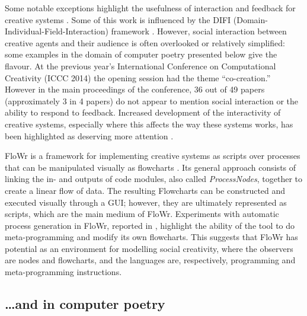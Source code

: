 Some notable exceptions highlight the usefulness of interaction and feedback for creative systems \cite{mcgraw93,
colton00,  sosa09, perezyperez10MM, pease10, saunders12}. Some of this
work is influenced by the DIFI (Domain-Individual-Field-Interaction)
framework \cite{csik88}.  However, social interaction
between creative agents and their audience is often overlooked
or relatively simplified: some examples in the domain of computer poetry presented below give the flavour.
At the previous year's International Conference on Computational Creativity (ICCC 2014) the opening session
had the theme ``co-creation.''  However in the main proceedings of the conference, 36 out of 49 papers
(approximately 3 in 4 papers) do not appear to mention social interaction or the ability to respond to feedback.
Increased development of the interactivity of creative systems, especially where this affects the way these systems works, has been highlighted as deserving more attention \cite{coltonwiggins12}.

FloWr is a framework for implementing creative systems as scripts over processes that can be manipulated visually as flowcharts \cite{charnley2014flowr}.  Its general approach consists of linking the in- and outputs of code modules, also called {\em ProcessNodes}, together to create a linear flow of data. The resulting Flowcharts can be constructed and executed visually through a GUI; however, they are ultimately represented as scripts, which are the main medium of FloWr. 
Experiments with automatic process generation in FloWr, reported in \cite{charnley2014flowr}, highlight the ability of the tool to do meta-programming and modify its own flowcharts. This suggests that FloWr has potential as an environment for modelling social creativity, where the observers are nodes and flowcharts, and the languages are, respectively, programming and meta-programming instructions.

\subsection{\ldots and in computer poetry}

